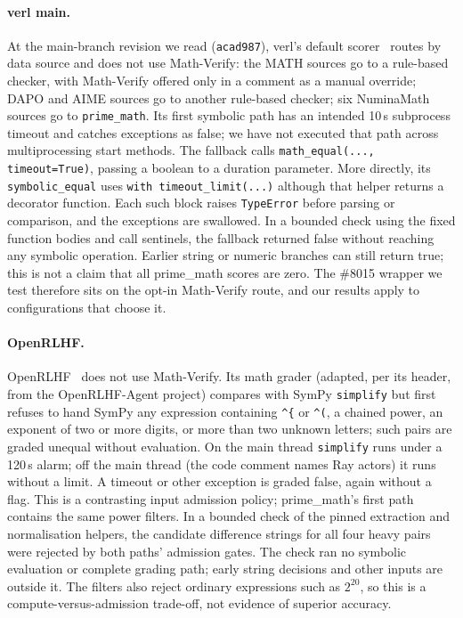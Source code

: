 \documentclass[10pt,a4paper]{article}
\let\cite\citep
\newcommand{\mv}{Math-Verify}
\begin{document}
\paragraph{verl main.} At the main-branch revision we read (\texttt{acad987}),
verl's default scorer~\cite{verlmain} routes by data source and does not use \mv{}: the
MATH sources go to a rule-based checker, with \mv{} offered only in a comment
as a manual override; DAPO and AIME sources go to another rule-based checker;
six NuminaMath sources go to \texttt{prime\_math}. Its first symbolic path
has an intended 10\,s subprocess timeout and catches exceptions as false;
we have not executed that path across multiprocessing start methods.
The fallback calls \texttt{math\_equal(..., timeout=True)}, passing a
boolean to a duration parameter. More directly, its \texttt{symbolic\_equal}
uses \texttt{with timeout\_limit(...)} although that helper returns a
decorator function. Each such block raises \texttt{TypeError} before parsing
or comparison, and the exceptions are swallowed. In a bounded check using
the fixed function bodies and call sentinels, the fallback returned false
without reaching any symbolic operation. Earlier string or numeric branches
can still return true; this is not a claim that all prime\_math scores are
zero. The \#8015 wrapper we test therefore sits on the
opt-in \mv{} route, and our results apply to configurations that choose it.

\paragraph{OpenRLHF.} OpenRLHF~\citep{openrlhf} does not use \mv{}. Its math
grader (adapted, per its header, from the OpenRLHF-Agent project) compares
with SymPy \texttt{simplify}
but first refuses to hand SymPy any expression containing \verb|^{| or
\verb|^(|, a chained power, an exponent of two or more digits, or more than two
unknown letters; such pairs are graded unequal without evaluation. On the main
thread \texttt{simplify} runs under a 120\,s alarm; off the main thread (the
code comment names Ray actors) it runs without a limit. A timeout or other
exception is graded false, again without a flag. This is a contrasting input
admission policy; prime\_math's first path contains the same power filters.
In a bounded check of the pinned extraction and normalisation helpers, the
candidate difference strings for all four heavy pairs were rejected by both
paths' admission gates. The check ran no symbolic evaluation or complete
grading path; early string decisions and other inputs are outside it. The
filters also reject ordinary expressions such as $2^{20}$, so this is a
compute-versus-admission trade-off, not evidence of superior accuracy.
\end{document}
